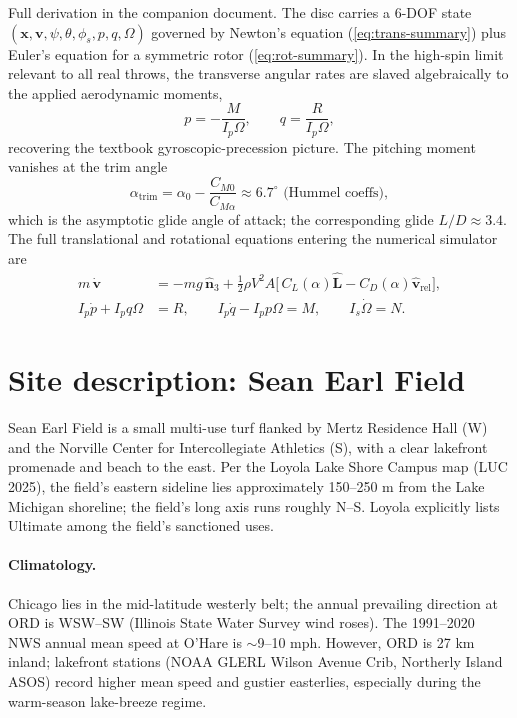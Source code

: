 \documentclass[11pt,letterpaper]{article}
\begin{document}
Full derivation in the companion document. The disc carries a 6-DOF state $(\mathbf{x}, \mathbf{v}, \psi, \theta, \phi_s, p, q, \Omega)$ governed by Newton's equation (\ref{eq:trans-summary}) plus Euler's equation for a symmetric rotor (\ref{eq:rot-summary}). In the high-spin limit relevant to all real throws, the transverse angular rates are slaved algebraically to the applied aerodynamic moments,
\begin{equation}
p = -\frac{M}{I_p \Omega}, \qquad q = \frac{R}{I_p \Omega},
\end{equation}
recovering the textbook gyroscopic-precession picture. The pitching moment vanishes at the trim angle
\begin{equation}
\alpha_{\text{trim}} = \alpha_0 - \frac{C_{M0}}{C_{M\alpha}} \approx 6.7^\circ \text{ (Hummel coeffs)},
\end{equation}
which is the asymptotic glide angle of attack; the corresponding glide $L/D \approx 3.4$. The full translational and rotational equations entering the numerical simulator are
\begin{align}
m\,\dot{\mathbf{v}} &= -mg\,\hat{\mathbf{n}}_3 + \tfrac{1}{2}\rho V^2 A\big[\,C_L(\alpha)\hat{\mathbf{L}} - C_D(\alpha)\hat{\mathbf{v}}_{\text{rel}}\big], \label{eq:trans-summary}\\
I_p \dot{p} + I_p q \Omega &= R,\qquad I_p \dot{q} - I_p p \Omega = M,\qquad I_s \dot{\Omega} = N. \label{eq:rot-summary}
\end{align}

\section{Site description: Sean Earl Field}

Sean Earl Field is a small multi-use turf flanked by Mertz Residence Hall (W) and the Norville Center for Intercollegiate Athletics (S), with a clear lakefront promenade and beach to the east. Per the Loyola Lake Shore Campus map (LUC 2025), the field's eastern sideline lies approximately 150--250 m from the Lake Michigan shoreline; the field's long axis runs roughly N--S. Loyola explicitly lists Ultimate among the field's sanctioned uses.

\paragraph{Climatology.} Chicago lies in the mid-latitude westerly belt; the annual prevailing direction at ORD is WSW--SW (Illinois State Water Survey wind roses). The 1991--2020 NWS annual mean speed at O'Hare is $\sim$9--10 mph. However, ORD is 27 km inland; lakefront stations (NOAA GLERL Wilson Avenue Crib, Northerly Island ASOS) record higher mean speed and gustier easterlies, especially during the warm-season lake-breeze regime.
\end{document}
